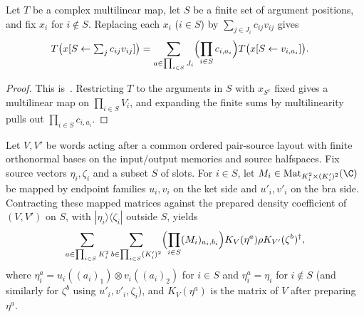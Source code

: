 \begin{lemma}
    \label{thm:peps_selected_multilinear_expansion}
    \leanok
    Let $T$ be a complex multilinear map, let $S$ be a finite set of argument positions, and fix $x_i$ for $i\notin S$. Replacing each $x_i$ ($i\in S$) by $\sum_{j\in J_i} c_{ij}v_{ij}$ gives
    \begin{align}
        T\bigl(x[S\leftarrow\textstyle\sum_j c_{ij}v_{ij}]\bigr)
         & =\sum_{a\in\prod_{i\in S}J_i}
        \Bigl(\prod_{i\in S}c_{i,a_i}\Bigr)
        T\bigl(x[S\leftarrow v_{i,a_i}]\bigr).
    \end{align}
\end{lemma}

\begin{proof}\leanok
    This is~\cite[``Expansion in selected multilinear
        arguments'']{QICLean2026Blueprint}.
    Restricting $T$ to the arguments in $S$ with $x_{S^c}$ fixed gives a multilinear map on $\prod_{i\in S}V_i$, and expanding the finite sums by multilinearity pulls out $\prod_{i\in S}c_{i,a_i}$.
\end{proof}

\begin{lemma}
    \label{thm:peps_prepared_source_frames}
    \leanok
    Let $V,V'$ be words acting after a common ordered pair-source layout with finite orthonormal bases on the input/output memories and source halfspaces. Fix source vectors $\eta_i,\zeta_i$ and a subset $S$ of slots. For $i\in S$, let $M_i\in\operatorname{Mat}_{K_i^2\times(K'_i)^2}(\C)$ be mapped by endpoint families $u_i,v_i$ on the ket side and $u'_i,v'_i$ on the bra side. Contracting these mapped matrices against the prepared density coefficient of $(V,V')$ on $S$, with $|\eta_i\rangle\langle\zeta_i|$ outside $S$, yields
    \begin{align}
        \sum_{a\in\prod_{i\in S}K_i^2}
        \sum_{b\in\prod_{i\in S}(K'_i)^2}
        \Bigl(\prod_{i\in S}(M_i)_{a_i,b_i}\Bigr)
        K_V(\eta^{a})\rho K_{V'}(\zeta^{b})^{\dagger},
    \end{align}
    where $\eta_i^a=u_i((a_i)_1)\otimes v_i((a_i)_2)$ for $i\in S$ and $\eta_i^a=\eta_i$ for $i\notin S$ (and similarly for $\zeta^b$ using $u'_i,v'_i,\zeta_i$), and $K_V(\eta^a)$ is the matrix of $V$ after preparing $\eta^a$.
\end{lemma}


